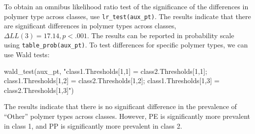 \documentclass[
  man,floatsintext]{apa6}
\newenvironment{Shaded}{\begin{snugshade}}{\end{snugshade}}
\newcommand{\FunctionTok}[1]{\textcolor[rgb]{0.00,0.00,0.00}{#1}}
\newcommand{\NormalTok}[1]{#1}
\newcommand{\StringTok}[1]{\textcolor[rgb]{0.31,0.60,0.02}{#1}}
\begin{document}
To obtain an omnibus likelihood ratio test of the significance of the differences in polymer type across classes,
use \texttt{lr\_test(aux\_pt)}.
The results indicate that there are significant differences in polymer types across classes, \(\Delta LL(3) = 17.14, p < .001\).
The results can be reported in probability scale using \texttt{table\_prob(aux\_pt)}.
To test differences for specific polymer types, we can use Wald tests:

\begin{Shaded}
\begin{Highlighting}[]
\FunctionTok{wald\_test}\NormalTok{(aux\_pt, }\StringTok{"class1.Thresholds[1,1] = class2.Thresholds[1,1];}
\StringTok{          class1.Thresholds[1,2] = class2.Thresholds[1,2];}
\StringTok{          class1.Thresholds[1,3] = class2.Thresholds[1,3]"}\NormalTok{)}
\end{Highlighting}
\end{Shaded}

The results indicate that there is no significant difference in the prevalence of ``Other'' polymer types across classes.
However, PE is significantly more prevalent in class 1, and PP is significantly more prevalent in class 2.
\end{document}
